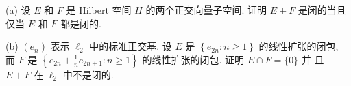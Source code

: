 



\begin{exercise}
    (a) 设 $E$ 和 $F$ 是 Hilbert 空间 $H$ 的两个正交向量子空间. 证明 $E+F$ 是闭的当且仅当 $E$ 和 $F$ 都是闭的.
    
    (b) $(e_{n})$ 表示 $\ell_{2}$ 中的标准正交基. 
    设 $E$ 是 $\left\{e_{2 n}: n \geq 1\right\}$ 的线性扩张的闭包, 
    而 $F$ 是 $\left\{e_{2 n}+\frac{1}{n} e_{2 n+1}: n \geq 1\right\}$ 的线性扩张的闭包. 
    证明 $E\cap F=\{0\}$ 并 且 $E+F$ 在 $\ell_{2}$ 中不是闭的.
\end{exercise}

